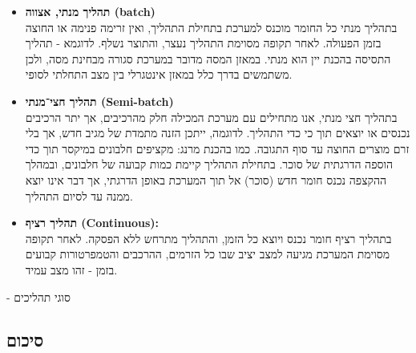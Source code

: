 \documentclass[
  hebrew,
  letterpaper,
  DIV=11,
  numbers=noendperiod]{scrreprt}
\begin{document}
\begin{itemize}
\item
  \textbf{תהליך מנתי, אצווה (batch)}\\
  בתהליך מנתי כל החומר מוכנס למערכת בתחילת התהליך, ואין זרימה פנימה או
  החוצה בזמן הפעולה. לאחר תקופה מסוימת התהליך נעצר, והתוצר נשלף. לדוגמא
  - תהליך התסיסה בהכנת יין הוא מנתי. במאזן המסה מדובר במערכת סגורה
  מבחינת מסה, ולכן משתמשים בדרך כלל במאזן אינטגרלי בין מצב התחלתי לסופי.
\item
  \textbf{תהליך חצי־מנתי (Semi-batch)}\\
  בתהליך חצי מנתי, אנו מתחילים עם מערכת המכילה חלק מהרכיבים, אך יתר
  הרכיבים נכנסים או יוצאים תוך כי כדי התהליך. לדוגמה, ייתכן הזנה מתמדת
  של מגיב חדש, אך בלי זרם מוצרים החוצה עד סוף התגובה. כמו בהכנת מרנג:
  מקציפים חלבונים במיקסר תוך כדי הוספה הדרגתית של סוכר. בתחילת התהליך
  קיימת כמות קבועה של חלבונים, ובמהלך ההקצפה נכנס חומר חדש (סוכר) אל תוך
  המערכת באופן הדרגתי, אך דבר אינו יוצא ממנה עד לסיום התהליך.
\item
  \textbf{תהליך רציף (Continuous):}\\
  בתהליך רציף חומר נכנס ויוצא כל הזמן, והתהליך מתרחש ללא הפסקה. לאחר
  תקופה מסוימת המערכת מגיעה למצב יציב שבו כל הזרמים, ההרכבים והטמפרטורות
  קבועים בזמן - זהו מצב עמיד.
\end{itemize}

{- סוגי תהליכים}

\subsection{סיכום}\label{ux5e1ux5d9ux5dbux5d5ux5dd-7}
\end{document}

